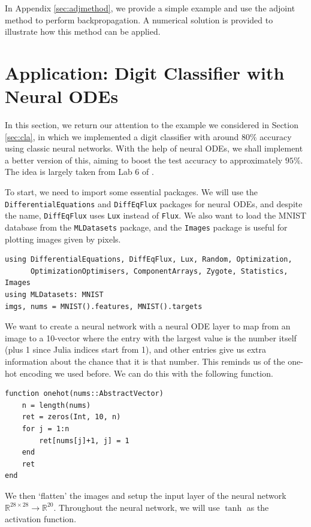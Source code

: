 \documentclass[a4paper,11pt,titlepage]{article}
\theoremstyle{definition}
\theoremstyle{plain}
\theoremstyle{remark}
\begin{document}
In Appendix \ref{sec:adjmethod}, we provide a simple example and use the adjoint method to perform backpropagation. A numerical solution is provided to illustrate how this method can be applied.

\pagebreak
\section{Application: Digit Classifier with Neural ODEs}
\label{sec:app}

In this section, we return our attention to the example we considered in Section \ref{sec:cla}, in which we implemented a digit classifier with around $80\%$ accuracy using classic neural networks. With the help of neural ODEs, we shall implement a better version of this, aiming to boost the test accuracy to approximately $95\%$. The idea is largely taken from Lab 6 of \cite{SciMLSANUM2024}.

To start, we need to import some essential packages. We will use the \verb|DifferentialEquations| and \verb|DiffEqFlux| packages for neural ODEs, and despite the name, \verb|DiffEqFlux| uses \verb|Lux| instead of \verb|Flux|. We also want to load the MNIST database from the \verb|MLDatasets| package, and the \verb|Images| package is useful for plotting images given by pixels.

\begin{verbatim}
using DifferentialEquations, DiffEqFlux, Lux, Random, Optimization,
      OptimizationOptimisers, ComponentArrays, Zygote, Statistics, Images
using MLDatasets: MNIST
imgs, nums = MNIST().features, MNIST().targets
\end{verbatim}

We want to create a neural network with a neural ODE layer to map from an image to a 10-vector where the entry with the largest value is the number itself (plus 1 since Julia indices start from 1), and other entries give us extra information about the chance that it is that number. This reminds us of the one-hot encoding we used before. We can do this with the following function.

\begin{verbatim}
function onehot(nums::AbstractVector)
    n = length(nums)
    ret = zeros(Int, 10, n)
    for j = 1:n
        ret[nums[j]+1, j] = 1
    end
    ret
end
\end{verbatim}

We then ‘flatten’ the images and setup the input layer of the neural network $\mathbb{R}^{28\times28}\rightarrow\mathbb{R}^{20}$. Throughout the neural network, we will use $\tanh$ as the activation function.
\end{document}
